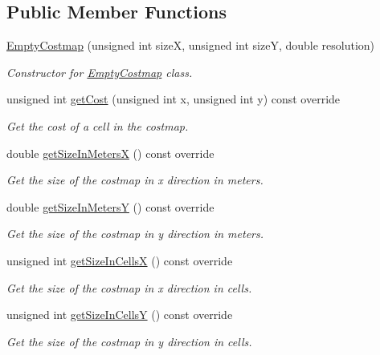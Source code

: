 \subsection*{Public Member Functions}
\begin{DoxyCompactItemize}
\item 
\hyperlink{classquadtree__planner_1_1EmptyCostmap_ac76dfd72c0366cc6ea8cf63a9adde273}{Empty\+Costmap} (unsigned int sizeX, unsigned int sizeY, double resolution)
\begin{DoxyCompactList}\small\item\em Constructor for \hyperlink{classquadtree__planner_1_1EmptyCostmap}{Empty\+Costmap} class. \end{DoxyCompactList}\item 
unsigned int \hyperlink{classquadtree__planner_1_1EmptyCostmap_a2d952b1e51adc413b4ca767e4cd082dc}{get\+Cost} (unsigned int x, unsigned int y) const override
\begin{DoxyCompactList}\small\item\em Get the cost of a cell in the costmap. \end{DoxyCompactList}\item 
double \hyperlink{classquadtree__planner_1_1EmptyCostmap_ae7bbb00b36630b65f3e5d5d55a519fdd}{get\+Size\+In\+MetersX} () const override
\begin{DoxyCompactList}\small\item\em Get the size of the costmap in x direction in meters. \end{DoxyCompactList}\item 
double \hyperlink{classquadtree__planner_1_1EmptyCostmap_aec6c2b1a739b6475f21219d688bc0b54}{get\+Size\+In\+MetersY} () const override
\begin{DoxyCompactList}\small\item\em Get the size of the costmap in y direction in meters. \end{DoxyCompactList}\item 
unsigned int \hyperlink{classquadtree__planner_1_1EmptyCostmap_a41621ddd089ca5112d02c1315241534c}{get\+Size\+In\+CellsX} () const override
\begin{DoxyCompactList}\small\item\em Get the size of the costmap in x direction in cells. \end{DoxyCompactList}\item 
unsigned int \hyperlink{classquadtree__planner_1_1EmptyCostmap_a2e3c5ddaaaee218d1cccf2a72dbe633f}{get\+Size\+In\+CellsY} () const override
\begin{DoxyCompactList}\small\item\em Get the size of the costmap in y direction in cells. \end{DoxyCompactList}\item 

\end{DoxyCompactItemize}

